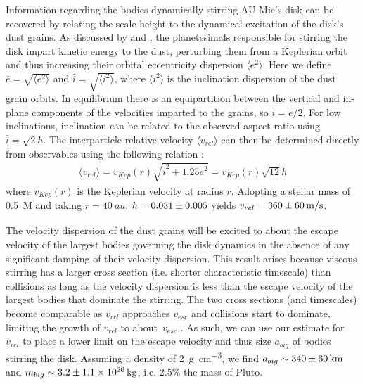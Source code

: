 \documentclass[modern]{aastex62}
\begin{document}
Information regarding the bodies dynamically stirring AU Mic's disk can be recovered by relating the scale height to the dynamical excitation of the disk's dust grains.
As discussed by \citet{thebault09} and \citet{quillen07}, the planetesimals responsible for stirring the disk impart kinetic energy to the dust, perturbing them from a Keplerian orbit and thus increasing their orbital eccentricity dispersion $\langle e^2 \rangle$. 
Here we define $\bar{e} = \sqrt{\langle e^2 \rangle}$ and $\bar{i} = \sqrt{\langle i^2 \rangle}$, where $\langle i^2 \rangle$ is the inclination dispersion of the dust grain orbits.
In equilibrium there is an equipartition between the vertical and in-plane components of the velocities imparted to the grains, so $\bar{i} = {\bar{e}}/{2}$.
For low inclinations, inclination can be related to the observed aspect ratio using $\bar{i} = \sqrt{2}h$.
The interparticle relative velocity $\langle v_{rel} \rangle$ can then be determined directly from observables using the following relation \citep{wetherill&stewart93,wyatt&dent02}:
\begin{gather}
  \langle v_{rel} \rangle = v_{Kep}(r) \sqrt{\bar{i}^2 + 1.25 \bar{e}^2} = v_{Kep}(r) \sqrt{12} h
\end{gather}
where $v_{Kep}(r)$ is the Keplerian velocity at radius $r$. 
Adopting a stellar mass of \SI{0.5}{M_\sun} and taking $r = \SI{40}{au}$, $h=\num{0.031 \pm 0.005}$ yields $v_{rel} = \SI{360 \pm 60}{m/s}$.

The velocity dispersion of the dust grains will be excited to about the escape velocity of the largest bodies governing the disk dynamics in the absence of any significant damping of their velocity dispersion. 
This result arises because viscous stirring has a larger cross section (i.e. shorter characteristic timescale) than collisions as long as the velocity dispersion is less than the escape velocity of the largest bodies that dominate the stirring. 
The two cross sections (and timescales) become comparable as $v_{rel}$ approaches $v_{esc}$ and collisions start to dominate, limiting the growth of $v_{rel}$ to about $v_{esc}$ \citep[e.g.]{schlichting14}.
As such, we can use our estimate for $v_{rel}$ to place a lower limit on the escape velocity and thus size $a_{big}$ of bodies stirring the disk.
Assuming a density of \SI{2}{\g.\cm^{-3}}, we find $a_{big} \sim \SI{340 \pm 60}{km}$ and $m_{big} \sim \SI{3.2 \pm 1.1e20}{kg}$, i.e. 2.5\% the mass of Pluto.
\end{document}
